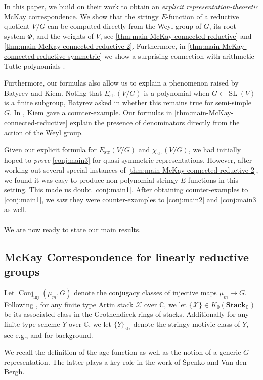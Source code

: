 \documentclass[12pt,a4paper]{amsart}
\theoremstyle{definition}
\newcommand{\CC}{\mathbb{C}}
\newcommand{\cX}{\mathcal{X}}
\newcommand{\Stack}{\mathbf{Stack}}
\newcommand{\str}{\mathrm{str}}
\renewcommand{\1}{\textbf{1}}
\newcommand{\<}{\langle}
\renewcommand{\>}{\rangle}
\DeclareMathOperator{\SL}{SL}
\DeclareMathOperator{\Conj}{Conj}
\DeclareMathOperator{\inj}{inj}
\begin{document}
In this paper, we build on their work to obtain an \emph{explicit representation-theoretic} McKay correspondence. We show that the stringy $E$-function of a reductive quotient $V/G$ can be computed directly from the Weyl group of $G$, its root system $\Phi$, and the weights of $V$, see \autoref{thm:main-McKay-connected-reductive} and \autoref{thm:main-McKay-connected-reductive-2}. Furthermore, in \autoref{thm:main-McKay-connected-reductive-symmetric}  we show a surprising connection with arithmetic Tutte polynomials \cite{BrandenMoci2014}.

Furthermore, our formulas also allow us to explain a phenomenon raised by Batyrev and Kiem. Noting that $E_{\str}(V/G)$ is a polynomial when $G\subset\SL(V)$ is a finite subgroup, Batyrev asked in \cite[Question 5.5]{Batyrev1998} whether this remains true for semi-simple $G$. In \cite{Kiem2003}, Kiem gave a counter-example. Our formulas in \autoref{thm:main-McKay-connected-reductive} explain the presence of denominators directly from the action of the Weyl group.

Given our explicit formula for $E_{\str}(V/G)$ and $\chi_{\str}(V/G)$, we had initially hoped to \emph{prove} \autoref{conj:main3} for quasi-symmetric representations. However, after working out several special instances of \autoref{thm:main-McKay-connected-reductive-2}, we found it was easy to produce non-polynomial stringy $E$-functions in this setting. This made us doubt \autoref{conj:main1}. After obtaining counter-examples to \autoref{conj:main1}, we saw they were counter-examples to \autoref{conj:main2} and \autoref{conj:main3} as well.\\
\\
We are now ready to state our main results.


\subsection{McKay Correspondence for linearly reductive groups}


Let $\Conj_{\inj}(\mu_m,G)$ denote the conjugacy classes of injective maps $\mu_m\to G$. Following \cite{Ekedahl}, for any finite type Artin stack $\cX$ over $\CC$, we let $\{\cX\}\in K_0(\Stack_\CC)$ be its associated class in the Grothendieck rings of stacks. Additionally for any finite type scheme $Y$ over $\CC$, we let $\{Y\}_{\str}$ denote the stringy motivic class of $Y$, see e.g., \cite[\S2.2]{SatrianoUsatine} and \cite[\S1.1]{SatrianoUsatine9} for background.

We recall the definition of the age function as well as the notion of a generic $G$-representation. The latter plays a key role in the work of \v{S}penko and Van den Bergh.
\end{document}
